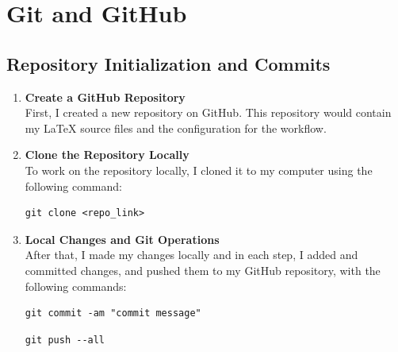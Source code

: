 \documentclass[titlepage]{article}
\begin{document}
\pagebreak

\section{Git and GitHub}

\subsection{Repository Initialization and Commits}
\begin{enumerate}
\item \textbf{Create a GitHub Repository}  
\\First, I created a new repository on GitHub. This repository would contain my \LaTeX \hspace{0pt} source files and the configuration for the workflow.
\item \textbf{Clone the Repository Locally} 
\\To work on the repository locally, I cloned it to my computer using the following command:  
\begin{adjustwidth}{1cm}{1cm}
\begin{tcolorbox}[codebox]
\begin{lstlisting}[numbers=none]
  git clone <repo_link>
\end{lstlisting}
\end{tcolorbox}
\end{adjustwidth}
\item \textbf{Local Changes and Git Operations}
\\After that, I made my changes locally and in each step, I added and committed changes, and pushed them to my GitHub repository, with the following commands:
\begin{adjustwidth}{1cm}{1cm}
\begin{tcolorbox}[codebox]
\begin{lstlisting}[numbers=none]
  git commit -am "commit message"
\end{lstlisting}
\end{tcolorbox}
\end{adjustwidth}
\begin{adjustwidth}{1cm}{1cm}
\begin{tcolorbox}[codebox]
\begin{lstlisting}[numbers=none]  
  git push --all
\end{lstlisting}
\end{tcolorbox}
\end{adjustwidth}
\end{enumerate}
\end{document}
